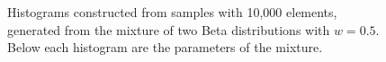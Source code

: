 \documentclass[10pt]{article}
\begin{document}
\begin{figure}[h]
{  }
  \caption{Histograms constructed from samples with 10,000 elements, generated 
from the mixture of two Beta distributions with $w=0.5$. Below each histogram 
are the parameters of the mixture.}
  \label{fig:14151617}
\end{figure}
\end{document}
